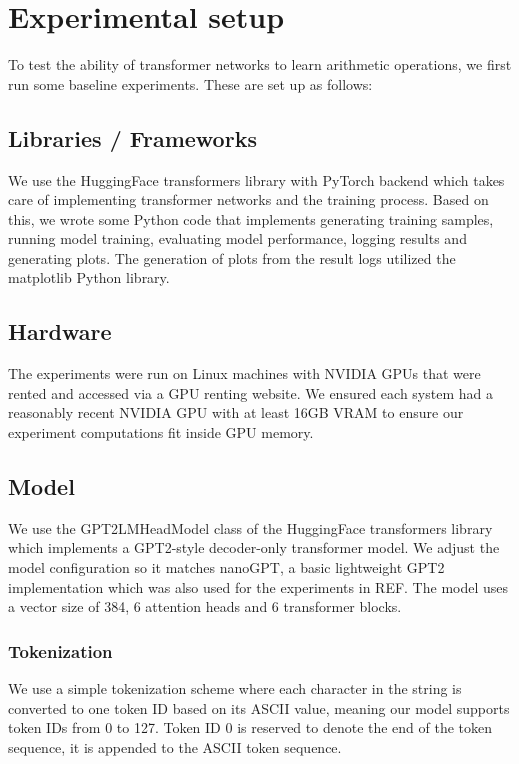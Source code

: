 \section{Experimental setup}
\label{expsetup}

To test the ability of transformer networks to learn arithmetic operations, we first run some baseline experiments. These are set up as follows:

\subsection{Libraries / Frameworks}

We use the HuggingFace transformers library with PyTorch backend which takes care of implementing transformer networks and the training process. Based on this, we wrote some Python code that implements generating training samples, running model training, evaluating model performance, logging results and generating plots. The generation of plots from the result logs utilized the matplotlib Python library.

\subsection{Hardware}
\label{expsetup:hardware}

The experiments were run on Linux machines with NVIDIA GPUs that were rented and accessed via a GPU renting website. We ensured each system had a reasonably recent NVIDIA GPU with at least 16GB VRAM to ensure our experiment computations fit inside GPU memory.

\subsection{Model}

We use the GPT2LMHeadModel class of the HuggingFace transformers library which implements a GPT2-style decoder-only transformer model.
We adjust the model configuration so it matches nanoGPT, a basic lightweight GPT2 implementation which was also used for the experiments in REF. 
The model uses a vector size of 384, 6 attention heads and 6 transformer blocks.

\subsubsection{Tokenization}

We use a simple tokenization scheme where each character in the string is converted to one token ID based on its ASCII value, meaning our model supports token IDs from 0 to 127. Token ID 0 is reserved to denote the end of the token sequence, it is appended to the ASCII token sequence.


